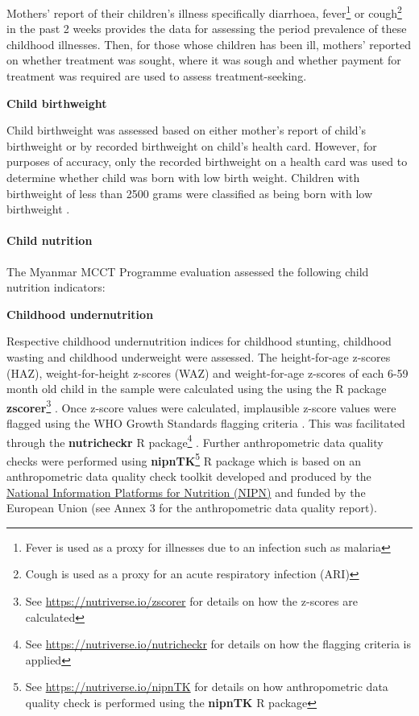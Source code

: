 \documentclass[12pt,a4paper]{article}
\let\oldparagraph\paragraph
\renewcommand{\paragraph}[1]{\oldparagraph{#1}\mbox{}}
\let\rmarkdownfootnote\footnote%
\def\footnote{\protect\rmarkdownfootnote}
\begin{document}
Mothers' report of their children's illness specifically diarrhoea, fever\footnote{Fever is used as a proxy for illnesses due to an infection such as malaria} or cough\footnote{Cough is used as a proxy for an acute respiratory infection (ARI)} in the past 2 weeks provides the data for assessing the period prevalence of these childhood illnesses. Then, for those whose children has been ill, mothers' reported on whether treatment was sought, where it was sough and whether payment for treatment was required are used to assess treatment-seeking.

\textbf{Child birthweight}

Child birthweight was assessed based on either mother's report of child's birthweight or by recorded birthweight on child's health card. However, for purposes of accuracy, only the recorded birthweight on a health card was used to determine whether child was born with low birth weight. Children with birthweight of less than 2500 grams were classified as being born with low birthweight \citep{Woertman:1993hp, Kelly:1997wa}.

\hypertarget{cnut}{%
\paragraph{Child nutrition}\label{cnut}}

The Myanmar MCCT Programme evaluation assessed the following child nutrition indicators:

\textbf{Childhood undernutrition}

Respective childhood undernutrition indices for childhood stunting, childhood wasting and childhood underweight were assessed. The height-for-age z-scores (HAZ), weight-for-height z-scores (WAZ) and weight-for-age z-scores of each 6-59 month old child in the sample were calculated using the using the R package \textbf{zscorer}\footnote{See \url{https://nutriverse.io/zscorer} for details on how the z-scores are calculated} \citep{zscorer2019}. Once z-score values were calculated, implausible z-score values were flagged using the WHO Growth Standards flagging criteria \citep{WorldHealthOrganizationWHO2006}. This was facilitated through the \textbf{nutricheckr} R package\footnote{See \url{https://nutriverse.io/nutricheckr} for details on how the flagging criteria is applied} \citep{nutricheckr2019}. Further anthropometric data quality checks were performed using \textbf{nipnTK}\footnote{See \url{https://nutriverse.io/nipnTK} for details on how anthropometric data quality check is performed using the \textbf{nipnTK} R package} \citep{nipnTK2019} R package which is based on an anthropometric data quality check toolkit developed and produced by the \href{http://www.nipn-nutrition-platforms.org}{National Information Platforms for Nutrition (NIPN)} and funded by the European Union (see Annex 3 for the anthropometric data quality report).
\end{document}

